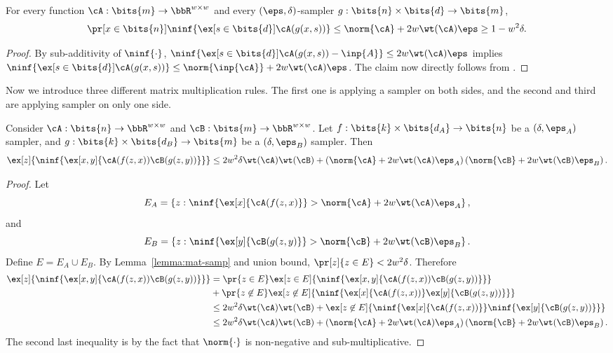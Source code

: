 \begin{corollary}\label{lemma:mat-samp}
For every function $\cA:\bits{m}\to\bbR^{w\times w}$ and every $(\eps,\delta)$-sampler $g:\bits{n}\times\bits{d}\to\bits{m}$,
$$\pr[x\in\bits{n}]{\ninf{\ex[s\in\bits{d}]{\cA(g(x,s))}}\le \norm{\cA}+2w\wt(\cA)\eps}\ge 1- w^2\delta.$$
\end{corollary}
\begin{proof}
By sub-additivity of $\ninf{\cdot}$, $\ninf{\ex[s\in\bits{d}]{\cA(g(x,s))}-\inp{A}}\le 2w\wt(\cA)\eps$ implies $\ninf{\ex[s\in\bits{d}]{\cA(g(x,s))}}\le \norm{\inp{\cA}}+2w\wt(\cA)\eps$. The claim now directly follows from .
\end{proof}
\noindent
Now we introduce three different matrix multiplication rules. The first one is applying a sampler on both sides, and the second and third are applying sampler on only one side. 
\begin{lemma}\label{lemma:sym}
Consider $\cA:\bits{n}\to\bbR^{w\times w}$ and $\cB:\bits{m}\to\bbR^{w\times w}$. Let $f:\bits{k}\times \bits{d_A}\to\bits{n}$ be a $(\delta,\eps_A)$ sampler, and $g:\bits{k}\times \bits{d_B}\to\bits{m}$ be a $(\delta,\eps_B)$ sampler. Then 
$$\ex[z]{\ninf{\ex[x,y]{\cA(f(z,x))\cB(g(z,y))}}}\le 2w^2\delta \wt(\cA)\wt(\cB)+\left(\norm{\cA}+2w\wt(\cA)\eps_A\right)\left(\norm{\cB}+2w\wt(\cB)\eps_B\right).$$
\end{lemma}
\begin{proof}
Let $$E_A=\left\{z: \ninf{\ex[x]{\cA(f(z,x)}}> \norm{\cA}+2w\wt(\cA)\eps_A\right\},$$and $$E_B=\left\{z: \ninf{\ex[y]{\cB(g(z,y)}}> \norm{\cB}+2w\wt(\cB)\eps_B\right\}.$$
Define $E=E_A\cup E_B$. By Lemma~\ref{lemma:mat-samp} and union bound, $\pr[z]{z\in E}<2w^2\delta$. Therefore
\begin{align*}
\ex[z]{\ninf{\ex[x,y]{\cA(f(z,x))\cB(g(z,y))}}}
&=\pr{z\in E}\ex[z\in E]{\ninf{\ex[x,y]{\cA(f(z,x))\cB(g(z,y))}}} \\
&+ \pr{z\not\in E}\ex[z\not\in E]{\ninf{\ex[x]{\cA(f(z,x))}\ex[y]{\cB(g(z,y))}}}\\
&\le 2w^2\delta \wt(\cA)\wt(\cB)+\ex[z\not\in E]{\ninf{\ex[x]{\cA(f(z,x))}}\ninf{\ex[y]{\cB(g(z,y))}}}\\
&\le 2w^2\delta \wt(\cA)\wt(\cB)+\left(\norm{\cA}+2w\wt(\cA)\eps_A\right)\left(\norm{\cB}+2w\wt(\cB)\eps_B\right).
\end{align*}
The second last inequality is by the fact that $\norm{\cdot}$ is non-negative and sub-multiplicative.
\end{proof}
